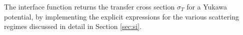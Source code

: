 \label{ch:vdSIDM_si}

The interface function  returns the transfer cross section $\sigma_T$ for a Yukawa potential, by implementing
the explicit expressions for the various scattering regimes discussed in detail in Section \ref{sec:si}.